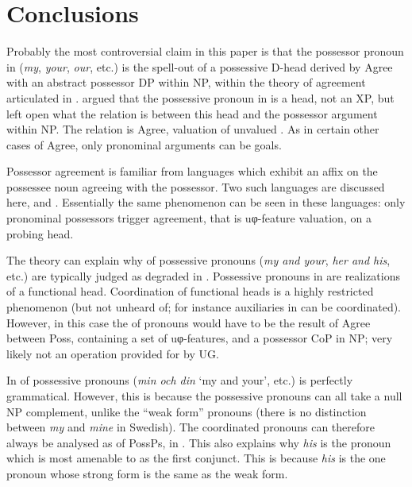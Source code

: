 \documentclass[output=paper]{langsci/langscibook}
\begin{document}
\section{Conclusions}\label{sec:16.4}\largerpage[2]

Probably the most controversial claim in this paper is that the possessor
pronoun in  (\emph{my}, \emph{your}, \emph{our}, etc.) is the spell-out
of a possessive D-head derived by Agree with an abstract possessor DP within
NP, within the theory of agreement articulated in
\textcite{Roberts2010,Roberts2010b}.  \citet{Delsing1998} argued that the
possessive pronoun in  is a head, not an XP, but left open what the
relation is between this head and the possessor argument within NP. The
relation is Agree, valuation of unvalued . As in certain other
cases of Agree, only pronominal arguments can be goals.

Possessor agreement is familiar from languages which exhibit an affix on the
possessee noun agreeing with the possessor. Two such languages are discussed
here,  and . Essentially the same phenomenon can be seen in
these languages: only pronominal possessors trigger agreement, that is
uφ-feature valuation, on a probing head.

The theory can explain why  of possessive pronouns (\emph{my and
your}, \emph{her and his}, etc.) are typically judged as degraded in .
Possessive pronouns in  are realizations of a functional head.
Coordination of functional heads is a highly restricted phenomenon (but not
unheard of; for instance auxiliaries in  can be coordinated). However,
in this case the  of pronouns would have to be the result of Agree
between Poss, containing a set of uφ-features, and a possessor CoP in NP; very
likely not an operation provided for by UG.

In   of possessive pronouns (\emph{min och din} `my and
your', etc.) is perfectly grammatical. However, this is because the 
possessive pronouns can all take a null NP complement, unlike the 
\enquote{weak form} pronouns (there is no distinction between \emph{my} and
\emph{mine} in Swedish). The coordinated pronouns can therefore always be
analysed as  of PossPs, in . This also explains why
\emph{his} is the  pronoun which is most amenable to  as the
first conjunct.  This is because \emph{his} is the one pronoun whose strong
form is the same as the weak form.
\end{document}
